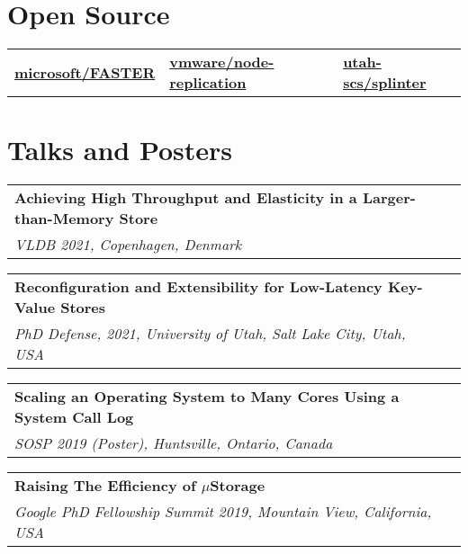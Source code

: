 \documentclass[margin,line]{res}
\begin{document}
\begin{resume}
\section{\sc Open Source}
\begin{tabular}{@{}p{2in}p{2in}p{2in}}
\href{{https://github.com/microsoft/FASTER}}{{\bf microsoft/FASTER}}
&
%
\href{{https://github.com/vmware/node-replication}}{{\bf vmware/node-replication}}
&
%
\href{{https://github.com/utah-scs/splinter}}
{{\bf utah-scs/splinter}}
\end{tabular}

\section{\sc Talks and Posters}
\begin{tabular}{@{}p{5.5in}p{4in}}
{\bf Achieving High Throughput and Elasticity in a Larger-than-Memory Store}\\
{\small\em VLDB 2021, Copenhagen, Denmark}\\
\end{tabular}

\vspace{-7pt}
\begin{tabular}{@{}p{5.5in}p{4in}}
{\bf Reconfiguration and Extensibility for Low-Latency Key-Value Stores}\\
{\small\em PhD Defense, 2021, University of Utah, Salt Lake City, Utah, USA}\\
\end{tabular}

\vspace{-7pt}
\begin{tabular}{@{}p{5.5in}p{4in}}
{\bf Scaling an Operating System to Many Cores Using a System Call Log}\\
{\small\em SOSP 2019 (Poster), Huntsville, Ontario, Canada}\\
\end{tabular}

\vspace{-7pt}
\begin{tabular}{@{}p{5.5in}p{4in}}
{\bf Raising The Efficiency of $\mu$Storage}\\
{\small\em Google PhD Fellowship Summit 2019, Mountain View, California,
USA}\\
\end{tabular}


\end{resume}
\end{document}
